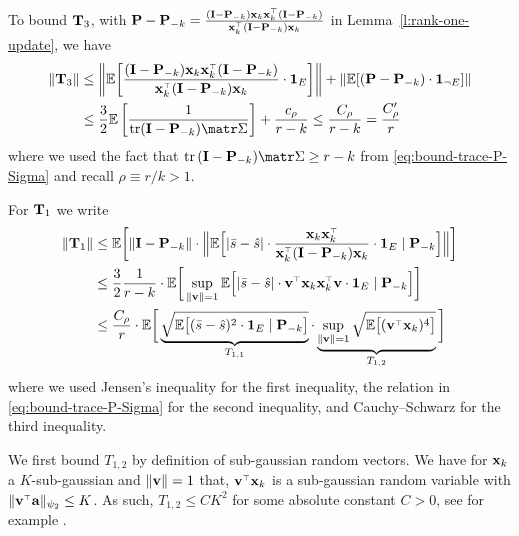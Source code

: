 \documentclass[../../thesis.tex]{subfiles}
\begin{document}
To bound $\mathbf{T}_3$, with $\P - \P_{-k} = \frac{(\I - \P_{-k})\x_k\x_k^\top (\I - \P_{-k})}{\x_k^\top (\I - \P_{-k}) \x_k}$ in Lemma~\ref{l:rank-one-update}, we have
\begin{align*}
  \|\T_3\| & \leq  \bigg\|
  \E\bigg[\frac{ (\I - \P_{-k}) \x_k\x_k^\top (\I - \P_{-k})}{\x_k^\top (\I - \P_{-k}) \x_k}
  \cdot \one_E \bigg]\bigg\|  + \| \E[ (\P - \P_{-k}) \cdot \one_{\neg E} ] \|                                                                      \\
           & \le \frac32 \E \left[ \frac1{ \tr (\I - \P_{-k} ) \Sigmab } \right] + \frac{c_\rho}{r - k} \leq \frac{C_\rho}{r-k} = \frac{C'_\rho}{r}
\end{align*}
where we used the fact that $\tr\,(\I - \P_{-k}) \Sigmab \ge r -k $ from \eqref{eq:bound-trace-P-Sigma} and recall $\rho \equiv r/k > 1$.


For $\mathbf{T}_1$ we write
\begin{align*}
  \|\T_1\| & \leq\E\bigg[\|\I - \P_{-k}\|\cdot \Big\|\E\Big[|\bar s-\hat s|\cdot
      \frac{\x_k\x_k^\top}{\x_k^\top( \I - \P_{-k}) \x_k} \cdot \one_E\mid\P_{-k}\Big]
    \Big\|\bigg]
  \\
           & \leq \frac32 \frac1{r-k} \cdot \E\bigg[\sup_{\| \v \| = 1}\E\Big[
      |\bar s-\hat s|\cdot \v^\top\x_k\x_k^\top\v\cdot\one_E\mid
      \P_{-k}\Big]\bigg]
  \\
           & \leq \frac{C_\rho}{r}\cdot \E\bigg[\underbrace{\sqrt{\E\big[(\bar s-\hat
        s)^2\cdot \one_E \mid\P_{-k}\big]}}_{ T_{1,1} }\cdot
  \underbrace{\sup_{ \| \v \| = 1 }\sqrt{\E\big[(\v^\top\x_k)^4\big]}}_{ T_{1,2} }\bigg]
\end{align*}
where we used Jensen's inequality for the first inequality, the relation in \eqref{eq:bound-trace-P-Sigma} for the second inequality, and Cauchy–Schwarz for the third inequality.

We first bound $T_{1,2}$ by definition of sub-gaussian random
vectors. We have for $\mathbf x_k$ a $K$-sub-gaussian and $\| \mathbf v \| = 1$
that, $\v^\top \x_k$ is a sub-gaussian random variable with $\|\v^\top
  \a \|_{\psi_2} \leq K$. As such, $T_{1,2} \le C K^2$ for some absolute
constant $C > 0$, see for example
\cite[Section~2.5.2]{vershynin2018high}.
\end{document}
